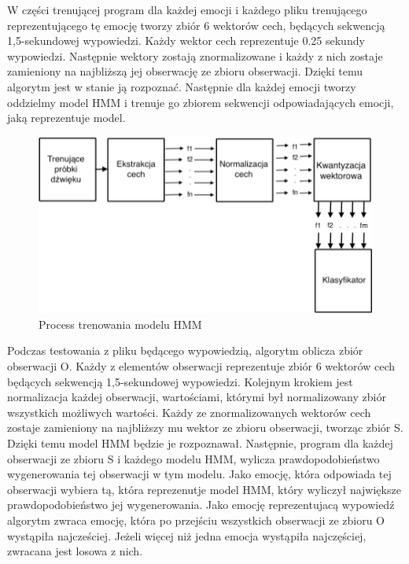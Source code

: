 \documentclass[declaration,shortabstract]{iithesis}
\begin{document}
W części trenującej program dla każdej emocji i każdego pliku trenującego reprezentującego tę emocję tworzy zbiór 6 wektorów cech, będących sekwencją 1,5-sekundowej wypowiedzi. Każdy wektor cech reprezentuje 0.25 sekundy wypowiedzi. Następnie wektory zostają znormalizowane i każdy z nich zostaje zamieniony na najbliższą jej obserwację ze zbioru obserwacji. Dzięki temu algorytm jest w stanie ją rozpoznać. Następnie dla każdej emocji tworzy oddzielmy model HMM i trenuje go zbiorem sekwencji odpowiadających emocji, jaką reprezentuje model.

\begin{figure}[!ht]
\hspace*{-5cm}  
	\caption{Process trenowania modelu HMM}
	\includegraphics[scale=0.35]{hmm_train.png}
\end{figure}

Podczas testowania z pliku będącego wypowiedzią, algorytm oblicza zbiór obserwacji O. Każdy z elementów obserwacji reprezentuje zbiór 6 wektorów cech będących sekwencją 1,5-sekundowej wypowiedzi. Kolejnym krokiem jest normalizacja każdej obserwacji, wartościami, którymi był normalizowany zbiór wszystkich możliwych wartości. Każdy ze znormalizowanych wektorów cech zostaje zamieniony na najbliższy mu wektor ze zbioru obserwacji, tworząc zbiór S. Dzięki temu model HMM będzie je rozpoznawał. Następnie, program dla każdej obserwacji ze zbioru S i każdego modelu HMM, wylicza prawdopodobieństwo wygenerowania tej obserwacji w tym modelu. Jako emocję, która odpowiada tej obserwacji wybiera tą, która reprezenutje model HMM, który wyliczył największe prawdopodobieństwo jej wygenerowania. Jako emocję reprezentujacą wypowiedź algorytm zwraca emocję, która po przejściu wszystkich obserwacji ze zbioru O wystąpiła najcześciej. Jeżeli więcej niż jedna emocja wystąpiła najczęściej, zwracana jest losowa z nich.
\end{document}
